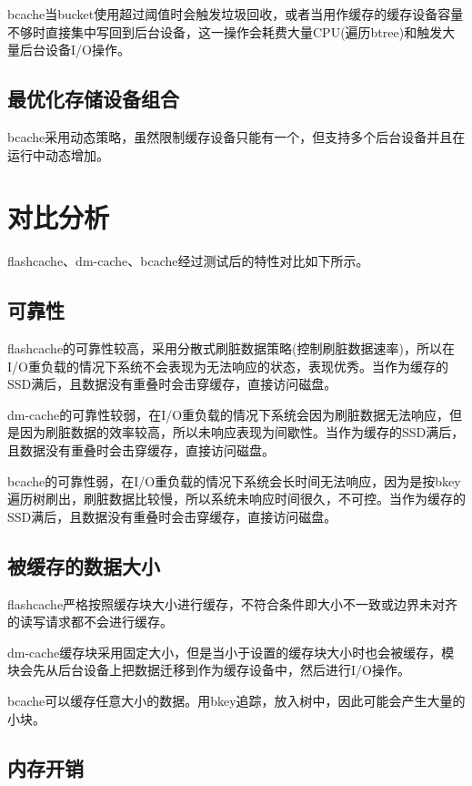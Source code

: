 bcache当bucket使用超过阈值时会触发垃圾回收，或者当用作缓存的缓存设备容量不够时直接集中写回到后台设备，这一操作会耗费大量CPU(遍历btree)和触发大量后台设备I/O操作。

\subsection{最优化存储设备组合}

bcache采用动态策略，虽然限制缓存设备只能有一个，但支持多个后台设备并且在运行中动态增加。

\section{对比分析}

flashcache、dm-cache、bcache经过测试后的特性对比如下所示。

\subsection{可靠性}

flashcache的可靠性较高，采用分散式刷脏数据策略(控制刷脏数据速率)，所以在I/O重负载的情况下系统不会表现为无法响应的状态，表现优秀。当作为缓存的SSD满后，且数据没有重叠时会击穿缓存，直接访问磁盘。 

dm-cache的可靠性较弱，在I/O重负载的情况下系统会因为刷脏数据无法响应，但是因为刷脏数据的效率较高，所以未响应表现为间歇性。当作为缓存的SSD满后，且数据没有重叠时会击穿缓存，直接访问磁盘。 

bcache的可靠性弱，在I/O重负载的情况下系统会长时间无法响应，因为是按bkey遍历树刷出，刷脏数据比较慢，所以系统未响应时间很久，不可控。当作为缓存的SSD满后，且数据没有重叠时会击穿缓存，直接访问磁盘。

\subsection{被缓存的数据大小}

flashcache严格按照缓存块大小进行缓存，不符合条件即大小不一致或边界未对齐的读写请求都不会进行缓存。

dm-cache缓存块采用固定大小，但是当小于设置的缓存块大小时也会被缓存，模块会先从后台设备上把数据迁移到作为缓存设备中，然后进行I/O操作。 

bcache可以缓存任意大小的数据。用bkey追踪，放入树中，因此可能会产生大量的小块。

\subsection{内存开销}

